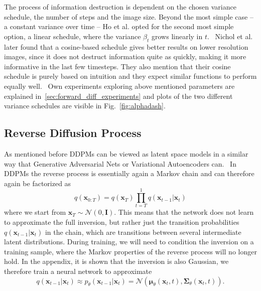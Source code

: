The process of information destruction is dependent on the chosen variance schedule, the number of steps and the image size. Beyond the most simple case -- a constant variance over time -- Ho et al. opted for the second most simple option, a linear schedule, where the variance $\beta_t$ grows linearly in $t$.~\autocite{ho2020denoising} Nichol et al. later found that a cosine-based schedule gives better results on lower resolution images, since it does not destruct information quite as quickly, making it more informative in the last few timesteps. They also mention that their cosine schedule is purely based on intuition and they expect similar functions to perform equally well.~\autocite{nichol2021improved}  Own experiments exploring above mentioned parameters are explained in~\ref{sec:forward_diff_experiments} and plots of the two different variance schedules are visible in Fig.~\ref{fig:alphadash}.

\subsection{Reverse Diffusion Process}
As mentioned before DDPMs can be viewed as latent space models in a similar way that Generative Adversarial Nets or Variational Autoencoders can.~\autocite{goodfellow2014generative,kingma2013autoencoding} In DDPMs the reverse process is essentially again a Markov chain and can therefore again be factorized as
\begin{equation}
    \label{eq:reverseprocess}
    q(\bm{x}_{0:T}) = q(\bm{x}_T) \prod_{t=T}^{1} q(\bm{x}_{t-1}|\bm{x}_{t})
\end{equation}
where we start from $\bm{x}_T\sim\mathcal{N}(0,\bm{I})$. This means that the network does not learn to approximate the full inversion, but rather just the transition probabilities $q(\bm{x}_{t-1}|\bm{x}_{t})$ in the chain, which are transitions between several intermediate latent distributions. During training, we will need to condition the inversion on a training sample, where the Markov properties of the reverse process will no longer hold. In the appendix, it is shown that the inversion is also Gaussian, we therefore train a neural network to approximate
\begin{equation}
    \label{eq:reverseapprox}
    q(\bm{x}_{t-1} | \bm{x}_t) \approx p_{\theta}(\bm{x}_{t-1} | \bm{x}_t) = \mathcal{N}(\bm{\mu}_{\theta}(\bm{x}_t, t),\bm{\Sigma}_{\theta}(\bm{x}_t, t)).
\end{equation}

